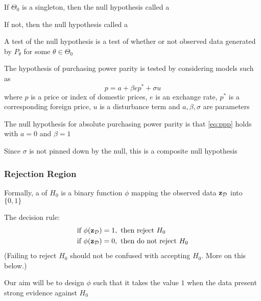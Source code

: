 \begin{frame}
    
    \vspace{2em}
    If $\Theta_0$ is a singleton, then the null
    hypothesis called a 
    
    \vspace{.7em}
    If not, then the null
    hypothesis called a 

    \vspace{.7em}
    A test of the null hypothesis is a test of whether or not observed data
    generated by $P_{\theta}$ for some $\theta \in \Theta_0$

\end{frame}

\begin{frame}

    \vspace{2em}
    \Eg
    The hypothesis of purchasing power parity is tested by considering models
    such as 
    \begin{equation*}
        \label{eq:ppp}
        p = a + \beta e p^* + \sigma u   
    \end{equation*}
    where $p$ is a price or index of domestic
    prices, $e$ is an exchange rate, $p^*$ is a corresponding foreign price,
    $u$ is a disturbance term and $a, \beta, \sigma$ are parameters
    
    \vspace{.7em}
    The null
    hypothesis for absolute purchasing power parity is that \eqref{eq:ppp}
    holds with $a = 0$ and
    $\beta=1$
    
    Since $\sigma$ is not pinned down by the null, this is a
    composite null hypothesis
    
\end{frame}

\begin{frame}\frametitle{Rejection Region}

    \vspace{2em}
    Formally, a  of $H_0$ is a binary function $\phi$ mapping the
    observed data $\mathbf{z}_{\mathcal D}$ into $\{0,1\}$
    
    \vspace{.7em}
    The decision rule:
    \begin{align*}
        \text{if } \phi(\mathbf{z}_{\mathcal D}) & = 1, \text{ then reject } H_0   \\
        \text{if } \phi(\mathbf{z}_{\mathcal D}) & = 0, \text{ then do not reject } H_0   
    \end{align*}
    (Failing to reject $H_0$ should not be confused with accepting $H_0$.  More on
    this below.) 
    
    Our aim will be to design $\phi$ such that it takes the value $1$ when the
    data present strong evidence against $H_0$
    
\end{frame}

